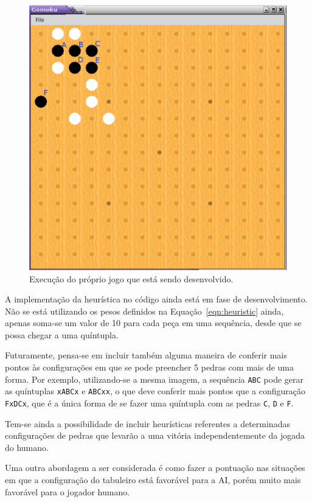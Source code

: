 \documentclass[10pt,a4paper]{article}
\begin{document}
\begin{figure}[!htbp]
    \centering
        \includegraphics[scale=0.5]{heuristic}
    \caption{Execução do próprio jogo que está sendo desenvolvido.}
    \label{fig:heuristic}
\end{figure}

A implementação da heurística no código ainda está em fase de desenvolvimento. Não se está utilizando os pesos definidos na Equação~\ref{eqn:heuristic} ainda, apenas soma-se um valor de 10 para cada peça em uma sequência, desde que se possa chegar a uma quíntupla.

Futuramente, pensa-se em incluir também alguma maneira de conferir mais pontos às configurações em que se pode preencher 5 pedras com mais de uma forma. Por exemplo, utilizando-se a mesma imagem, a sequência \texttt{ABC} pode gerar as quíntuplas \texttt{xABCx} e \texttt{ABCxx}, o que deve conferir mais pontos que a configuração \texttt{FxDCx}, que é a única forma de se fazer uma quíntupla com as pedras \texttt{C}, \texttt{D} e \texttt{F}.

Tem-se ainda a possibilidade de incluir heurísticas referentes a determinadas configurações de pedras que levarão a uma vitória independentemente da jogada do humano.

Uma outra abordagem a ser considerada é como fazer a pontuação nas situações em que a configuração do tabuleiro está favorável para a AI, porém muito mais favorável para o jogador humano.
\end{document}
